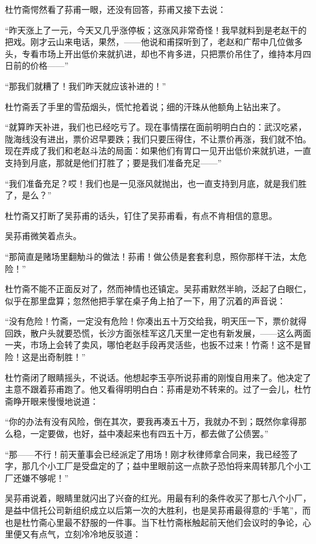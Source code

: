 \par 杜竹斋愕然看了荪甫一眼，还没有回答，荪甫又接下去说：
\par “昨天涨上了一元，今天又几乎涨停板；这涨风非常奇怪！我早就料到是老赵干的把戏。刚才云山来电话，果然，——他说和甫探听到了，老赵和广帮中几位做多头，专看市场上开出低价来就扒进，却也不肯多进，只把票价吊住了，维持本月四日前的价格——”
\par “那我们就糟了！我们昨天就应该补进的！”
\par 杜竹斋丢了手里的雪茄烟头，慌忙抢着说；细的汗珠从他额角上钻出来了。
\par “就算昨天补进，我们也已经吃亏了。现在事情摆在面前明明白白的：武汉吃紧，陇海线没有进出，票价迟早要跌；我们只要压得住，不让票价再涨，我们就不怕。现在弄成了我们和老赵斗法的局面：如果他们有胃口一见开出低价来就扒进，一直支持到月底，那就是他们打胜了；要是我们准备充足——”
\par “我们准备充足？哎！我们也是一见涨风就抛出，也一直支持到月底，就是我们胜了，是么？”
\par 杜竹斋又打断了吴荪甫的话头，钉住了吴荪甫看，有点不肯相信的意思。
\par 吴荪甫微笑着点头。
\par “那简直是赌场里翻觔斗的做法！荪甫！做公债是套套利息，照你那样干法，太危险！”
\par 杜竹斋不能不正面反对了，然而神情也还镇定。吴荪甫默然半晌，泛起了白眼仁，似乎在那里盘算；忽然他把手掌在桌子角上拍了一下，用了沉着的声音说：
\par “没有危险！竹斋，一定没有危险！你凑出五十万交给我，明天压一下，票价就得回跌，散户头就要恐慌，长沙方面张桂军这几天里一定也有新发展，——这么两面一夹，市场上会转了卖风，哪怕老赵手段再灵活些，也扳不过来！竹斋！这不是冒险！这是出奇制胜！”
\par 杜竹斋闭了眼睛摇头，不说话。他想起李玉亭所说荪甫的刚愎自用来了。他决定了主意不跟着荪甫跑了。他又看得明明白白：荪甫是劝不转来的。过了一会儿，杜竹斋睁开眼来慢慢地说道：
\par “你的办法有没有风险，倒在其次，要我再凑五十万，我就办不到；既然你拿得那么稳，一定要做，也好，益中凑起来也有四五十万，都去做了公债罢。”
\par “那——不行！前天董事会已经派定了用场！刚才秋律师拿合同来，我已经签了字，那几个小工厂是受盘定的了；益中里眼前这一点款子恐怕将来周转那几个小工厂还嫌不够呢！”
\par 吴荪甫说着，眼睛里就闪出了兴奋的红光。用最有利的条件收买了那七八个小厂，是益中信托公司新组织成立以后第一次的大胜利，也是吴荪甫最得意的“手笔”，而也是杜竹斋心里最不舒服的一件事。当下杜竹斋枨触起前天他们会议时的争论，心里便又有点气，立刻冷冷地反驳道：

